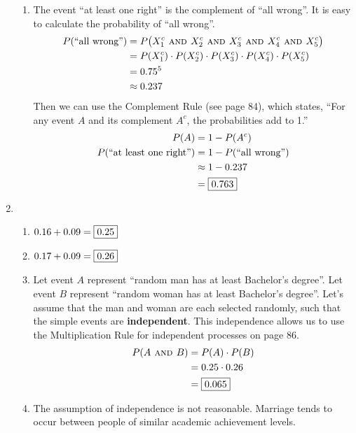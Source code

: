 \documentclass[12pt,letterpaper]{article}
\begin{document}
\begin{enumerate}
\begin{enumerate}
\item The event ``at least one right'' is the complement of ``all wrong''. It is easy to calculate the probability of ``all wrong''.
\begin{align*} 
P(\text{``all wrong''}) &= P\big(X_1^c \textsc{~and~} X_2^c \textsc{~and~} X_3^c \textsc{~and~} X_4^c \textsc{~and~} X_5^c\big) \\
&= P(X_1^c) \cdot P(X_2^c)\cdot P(X_3^c)\cdot P(X_4^c)\cdot P(X_5^c) \\
&= 0.75^5 \\
&\approx 0.237
\end{align*}
Then we can use the Complement Rule (see page 84), which states, ``For any event $A$ and its complement $A^c$, the probabilities add to 1.''
\begin{align*}
P(A) &= 1 - P(A^c) \\
P(\text{``at least one right''}) &= 1 - P(\text{``all wrong''})\\
&\approx 1 - 0.237\\
&= \fbox{0.763}
\end{align*}
\end{enumerate}

\item \begin{enumerate}
\item $0.16+0.09 = \fbox{0.25}$
\item $0.17+0.09 = \fbox{0.26}$
\item Let event $A$ represent ``random man has at least Bachelor's degree''. Let event $B$ represent ``random woman has at least Bachelor's degree''. Let's assume that the man and woman are each selected randomly, such that the simple events are {\bf independent}. This independence allows us to use the Multiplication Rule for independent processes on page 86. 
\begin{align*}
P(A\textsc{~and~} B) &= P(A)\cdot P(B) \\
&= 0.25 \cdot 0.26 \\
&= \fbox{0.065}
\end{align*}
\item The assumption of independence is not reasonable. Marriage tends to occur between people of similar academic achievement levels.
\end{enumerate}


\end{enumerate}
\end{document}
